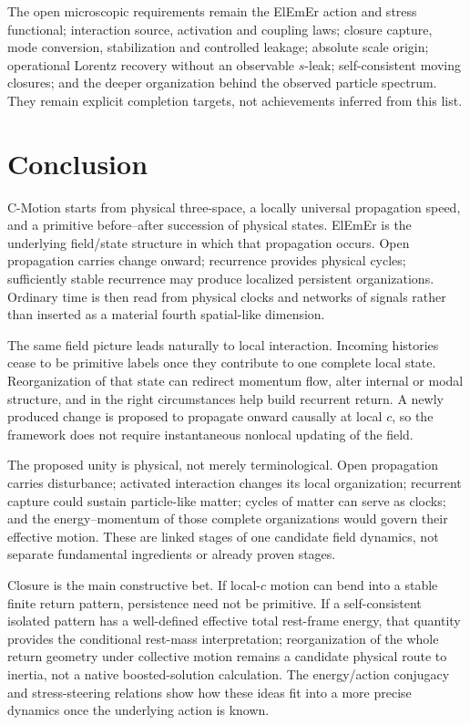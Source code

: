 \documentclass[11pt]{article}
\theoremstyle{definition}
\newcommand{\cmotion}{\mbox{C-Motion}}
\newcommand{\ElEmEr}{\mbox{ElEmEr}}
\begin{document}
The open microscopic requirements remain the \ElEmEr{} action and stress
functional; interaction source, activation and coupling laws; closure capture,
mode conversion, stabilization and controlled leakage; absolute scale origin;
operational Lorentz recovery without an observable $s$-leak; self-consistent
moving closures; and the deeper organization behind the observed particle
spectrum.  They remain explicit completion targets, not achievements inferred
from this list.

\section{Conclusion}
\label{sec:conclusion}

\cmotion{} starts from physical three-space, a locally universal propagation speed, and a
primitive before--after succession of physical states.  \ElEmEr{} is the underlying
field/state structure in which that propagation occurs.  Open propagation carries
change onward; recurrence provides physical cycles; sufficiently stable recurrence may
produce localized persistent organizations.  Ordinary time is then read from physical
clocks and networks of signals rather than inserted as a material fourth spatial-like
dimension.

The same field picture leads naturally to local interaction.  Incoming histories cease
to be primitive labels once they contribute to one complete local state.  Reorganization
of that state can redirect momentum flow, alter internal or modal structure, and in the
right circumstances help build recurrent return.  A newly produced change is proposed
to propagate onward causally at local $c$, so the framework does not require
instantaneous nonlocal updating of the field.

The proposed unity is physical, not merely terminological.  Open propagation
carries disturbance; activated interaction changes its local organization;
recurrent capture could sustain particle-like matter; cycles of matter can
serve as clocks; and the energy--momentum of those complete organizations
would govern their effective motion.  These are linked stages of one candidate
field dynamics, not separate fundamental ingredients or already proven stages.

Closure is the main constructive bet.  If local-$c$ motion can bend into a stable finite
return pattern, persistence need not be primitive.  If a self-consistent isolated pattern has a well-defined effective total
rest-frame energy, that quantity provides the conditional rest-mass interpretation;
reorganization of the whole return geometry under collective motion remains a
candidate physical route to inertia, not a native boosted-solution calculation.  The energy/action conjugacy and stress-steering relations show how these ideas
fit into a more precise dynamics once the underlying action is known.
\end{document}
